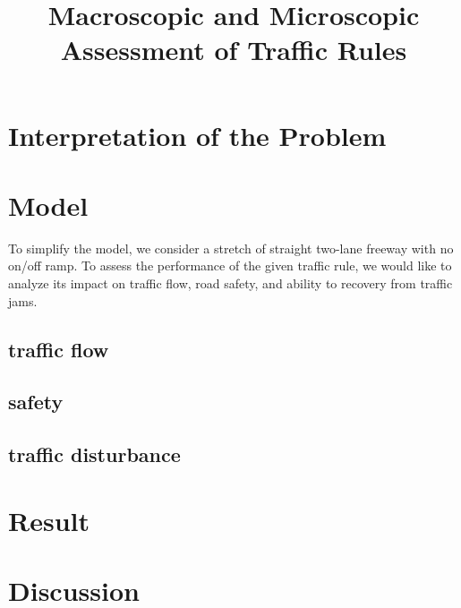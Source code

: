 \documentclass[aps,prl,superscriptaddress,12pt]{revtex4-1}
\begin{document}
	\title{Macroscopic and Microscopic Assessment of Traffic Rules }
		
	\begin{abstract}
		
	\end{abstract}
	
\maketitle

	\section{Interpretation of the Problem}


	\section{Model}
	To simplify the model, we consider a stretch of straight two-lane freeway with no on/off ramp. To assess the performance of the given traffic rule, we would like to analyze its impact on traffic flow, road safety, and ability to recovery from traffic jams.
	\subsection{traffic flow} 
	
	
	\subsection{safety}
	
	
	\subsection{traffic disturbance}
	
	
	\pagebreak

	\section{Result}

	\section{Discussion}
	


\end{document}
